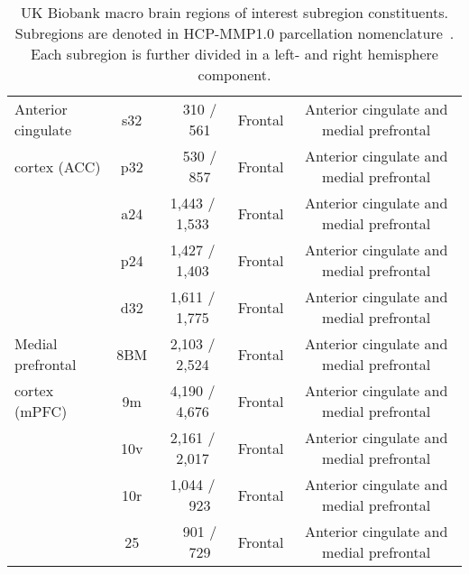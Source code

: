 \begin{table*}[ht]
{\begin{tabular}{ l | c | c | c | c }
      Anterior cingulate                      & s32                 & ~~310 / ~~561     & Frontal   & Anterior cingulate and medial prefrontal    \\
      cortex (ACC)                            & p32                 & ~~530 / ~~857     & Frontal   & Anterior cingulate and medial prefrontal    \\
                                              & a24                 & 1,443 / 1,533     & Frontal   & Anterior cingulate and medial prefrontal    \\
                                              & p24                 & 1,427 / 1,403     & Frontal   & Anterior cingulate and medial prefrontal    \\
                                              & d32                 & 1,611 / 1,775     & Frontal   & Anterior cingulate and medial prefrontal    \\

      \midrule

      Medial prefrontal                       & 8BM                 & 2,103 / 2,524     & Frontal   & Anterior cingulate and medial prefrontal    \\
      cortex (mPFC)                           & 9m                  & 4,190 / 4,676     & Frontal   & Anterior cingulate and medial prefrontal    \\
                                              & 10v                 & 2,161 / 2,017     & Frontal   & Anterior cingulate and medial prefrontal    \\
                                              & 10r                 & 1,044 / ~~923     & Frontal   & Anterior cingulate and medial prefrontal    \\
                                              & 25                  & ~~901 / ~~729     & Frontal   & Anterior cingulate and medial prefrontal    \\
      \bottomrule
    \end{tabular}
  }
  \caption{
    UK Biobank macro brain regions of interest subregion constituents.
    Subregions are denoted in HCP-MMP1.0 parcellation nomenclature~\parencite{Glasser2016}.
    Each subregion is further divided in a left- and right hemisphere component.
  }
  \label{tab:ukbiobank-brain-regions}
\end{table*}
